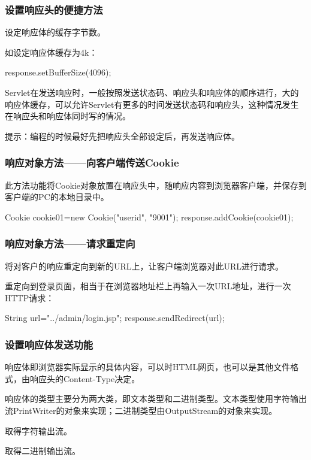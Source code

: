 \begin{frame}[fragile] %
\frametitle{设置响应头的便捷方法} 


设定响应体的缓存字节数。

如设定响应体缓存为4k：
\begin{javaCode}
response.setBufferSize(4096);  
\end{javaCode}

{\kai Servlet在发送响应时，一般按照发送状态码、响应头和响应体的顺序进行，大的响应体缓存，可以允许Servlet有更多的时间发送状态码和响应头，这种情况发生在响应头和响应体同时写的情况。}

提示：编程的时候最好先把响应头全部设定后，再发送响应体。
\end{frame}

\begin{frame}[fragile] %
\frametitle{响应对象方法——向客户端传送Cookie} 


此方法功能将Cookie对象放置在响应头中，随响应内容到浏览器客户端，并保存到客户端的PC的本地目录中。

\begin{javaCode}
Cookie cookie01=new Cookie("userid", "9001");
response.addCookie(cookie01);
\end{javaCode}

\end{frame}

\begin{frame}[fragile] %
\frametitle{响应对象方法——请求重定向} 


将对客户的响应重定向到新的URL上，让客户端浏览器对此URL进行请求。

{\kai 重定向到登录页面，相当于在浏览器地址栏上再输入一次URL地址，进行一次HTTP请求：}

\begin{javaCode}
 String url="../admin/login.jsp";
 response.sendRedirect(url);
 \end{javaCode}
\end{frame}

\begin{frame}[fragile] %
\frametitle{设置响应体发送功能}

响应体即浏览器实际显示的具体内容，可以时HTML网页，也可以是其他文件格式，由响应头的Content-Type决定。

响应体的类型主要分为两大类，即文本类型和二进制类型。{\Red 文本类型使用字符输出流PrintWriter的对象来实现；二进制类型由OutputStream的对象来实现。}


取得字符输出流。


取得二进制输出流。

\end{frame}

